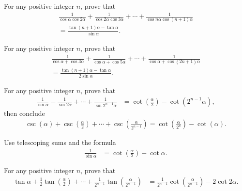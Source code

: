 \documentclass[12pt,a4paper]{memoir}
\theoremstyle{definition}
\begin{document}
\begin{question}
	For any positive integer $n$, prove that
	\begin{multline*}
		\frac{1}{\cos \alpha \cos 2\alpha}+\frac{1}{\cos 2\alpha \cos 3\alpha}+\cdots+\frac{1}{\cos n\alpha \cos (n+1)\alpha} \\ = \frac{\tan(n+1)\alpha - \tan\alpha}{\sin \alpha}.
	\end{multline*}
\end{question}


\begin{question}
	For any positive integer $n$, prove that
	\begin{multline*}
		\frac{1}{\cos \alpha +\cos 3\alpha}+\frac{1}{\cos \alpha + \cos 5\alpha}+\cdots+\frac{1}{\cos \alpha + \cos (2n+1)\alpha} \\ = \frac{\tan(n+1)\alpha - \tan\alpha}{2\sin \alpha}.
	\end{multline*}
\end{question}




\begin{question}
	For any positive integer $n$, prove that
	\begin{align*}
		\frac{1}{\sin \alpha}+\frac{1}{\sin 2\alpha}+\cdots+\frac{1}{\sin 2^{n-1}\alpha}&= \cot\left(\frac{\alpha}{2}\right) - \cot\left(2^{n-1}\alpha\right),
	\end{align*}
	then conclude
	\begin{align*}
		\csc\left(\alpha\right)+\csc\left(\frac{\alpha}{2}\right)+\cdots+\csc\left(\frac{\alpha}{2^{n-1}}\right) = \cot\left(\frac{\alpha}{2^{n}}\right) - \cot\left(\alpha\right).
	\end{align*}
\end{question}


\begin{solution}
	Use telescoping sums and the formula
	\begin{align*}
		\frac{1}{\sin \alpha} &= \cot\left(\frac{\alpha}{2}\right) - \cot\alpha. 
	\end{align*}
\end{solution}

\begin{question}
	For any positive integer $n$, prove that
	\begin{align*}
		\tan \alpha + \frac{1}{2}\tan\left(\frac{\alpha}{2}\right) + \cdots +  \frac{1}{2^{n-1}}\tan\left(\frac{\alpha}{2^{n-1}}\right) &= \frac{1}{2^{n-1}}\cot\left(\frac{\alpha}{2^{n-1}}\right) - 2 \cot 2\alpha.
	\end{align*}
\end{question}
\end{document}

